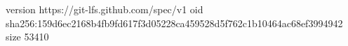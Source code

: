 version https://git-lfs.github.com/spec/v1
oid sha256:159d6ec2168b4fb9fd617f3d05228ca459528d5f762c1b10464ac68ef3994942
size 53410
